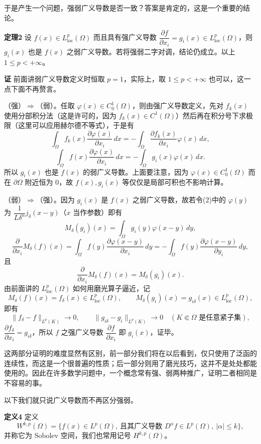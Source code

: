 于是产生一个问题，强弱广义导数是否一致？答案是肯定的，这是一个重要的结论。

\noindent\textbf{定理2}
设 $f(x)\in L^p_{\mathrm{loc}}(\Omega)$ 而且具有强广义导数 $\dfrac{\partial f}{\partial x_i}=g_i(x)\in L^p_{\mathrm{loc}}(\Omega)$，则 $g_i(x)$ 也是 $f(x)$ 之弱广义导数。若将强弱二字对调，结论仍成立。以上 $1\le p<+\infty$。

\noindent\textbf{证}
前面讲弱广义导数定义时恒取 $p=1$，实际上，取 $1\le p<+\infty$ 也可以，这一点下面不再赘言。

（强）$\Rightarrow$（弱）。任取 $\varphi(x)\in C_0^1(\Omega)$，则由强广义导数定义，先对 $f_k(x)$ 使用分部积分法（这是许可的，因为 $f_k(x)\in C^1(\Omega)$）然后再在积分号下求极限（这里可以应用赫尔德不等式），于是有
\[
 \int_\Omega f_k(x)\frac{\partial\varphi(x)}{\partial x_i}\,dx
 =-\int_\Omega\frac{\partial f_k(x)}{\partial x_i}\varphi(x)\,dx,
\]
\[
 \int_\Omega f(x)\frac{\partial\varphi(x)}{\partial x_i}\,dx
 =-\int_\Omega g_i(x)\varphi(x)\,dx.
\]
所以 $g_i(x)$ 也是 $f(x)$ 的弱广义导数。上面要注意，因为 $\varphi(x)\in C_0^1(\Omega)$ 而在 $\partial\Omega$ 附近恒为 0，故 $f(x),g_i(x)$ 等仅仅是局部可积也不影响计算。

（弱）$\Rightarrow$（强）。因为 $g_i(x)$ 是 $f(x)$ 之弱广义导数，故若令(2)中的 $\varphi(y)$ 为 $\dfrac1{L\delta^n}j_\delta(x-y)$（$x$ 当作参数）即有
\[
 M_\delta(g_i)(x)=\int_\Omega g_i(y)\varphi(x-y)\,dy,
\]
\[
 \frac{\partial}{\partial x_i}M_\delta(f)(x)
 =\int_\Omega f(y)\frac{\partial\varphi(x-y)}{\partial x_i}\,dy
 =-\int_\Omega f(y)\frac{\partial\varphi(x-y)}{\partial y_i}\,dy,
\]
且
\[
 \frac{\partial}{\partial x_i}M_\delta(f)(x)=M_\delta(g_i)(x).
\]
由前面讲的 $L^p_{\mathrm{loc}}(\Omega)$ 如何用磨光算子逼近，记
\[
 M_\delta(f)(x)=f_\delta(x)\in L^p_{\mathrm{loc}}(\Omega),\qquad
 M_\delta(g_i)(x)=g_{i\delta}(x)\in L^p_{\mathrm{loc}}(\Omega),
\]
即有
\[
 \|f_\delta-f\|_{L^p(K)}\to0,\qquad
 \|g_{i\delta}-g_i\|_{L^p(K)}\to0
 \quad(K\Subset\Omega\text{ 是任意紧子集}),
\]
$\dfrac{\partial f_\delta}{\partial x_i}=g_{i\delta}$，所以 $f$ 之强广义导数 $\dfrac{\partial f}{\partial x_i}$ 即 $g_i(x)$，证毕。

这两部分证明的难度显然有区别，前一部分我们将在以后看到，仅只使用了泛函的连续性，而这是一个很普遍的性质；后一部分则用了磨光技巧，这并不是处处都能使用的。因此在许多数学问题中，一个概念常有强、弱两种推广，证明二者相同是不容易的事。

以下我们就只说广义导数而不再区分强弱。

\noindent\textbf{定义4}
定义
\begin{equation}
 W^{k,p}(\Omega)=\{f(x)\in L^p(\Omega),\ \text{且其广义导数 }D^\alpha f\in L^p(\Omega),\ |\alpha|\le k\},
 \tag{6}
\end{equation}
并称它为 Sobolev 空间，我们也常用记号 $H^{k,p}(\Omega)$。

